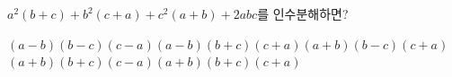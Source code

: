 $a^2(b+c)+b^2(c+a)+c^2(a+b)+2abc$를 인수분해하면?
\begin{choicesv}{$(a-b)(b-c)(c-a)$}{$(a-b)(b+c)(c+a)$}{$(a+b)(b-c)(c+a)$}{$(a+b)(b+c)(c-a)$}{$(a+b)(b+c)(c+a)$}\end{choicesv}
